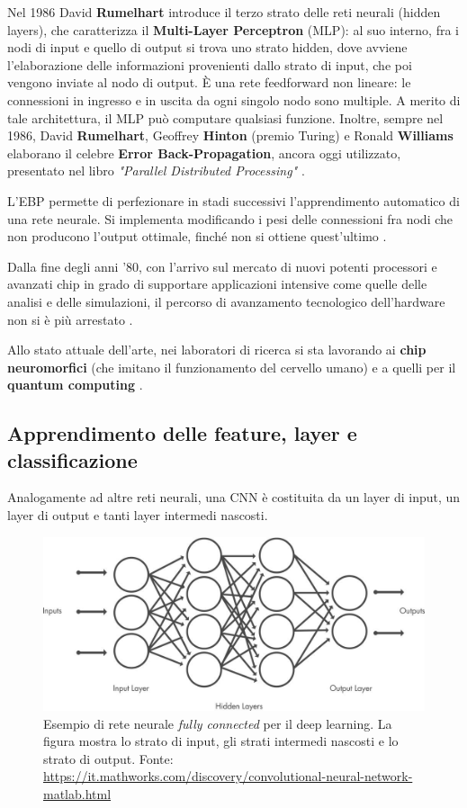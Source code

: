 Nel 1986 David \textbf{Rumelhart} introduce il terzo strato delle reti neurali (hidden layers), che caratterizza il \textbf{Multi-Layer Perceptron} (MLP): al suo interno, fra i nodi di input e quello di output si trova uno strato hidden, dove avviene l’elaborazione delle informazioni provenienti dallo strato di input, che poi vengono inviate al nodo di output. È una rete feedforward non lineare: le connessioni in ingresso e in uscita da ogni singolo nodo sono multiple. A merito di tale architettura, il MLP può computare qualsiasi funzione. Inoltre, sempre nel 1986, David \textbf{Rumelhart}, Geoffrey \textbf{Hinton} (premio Turing) e Ronald \textbf{Williams} elaborano il celebre \textbf{Error Back-Propagation}, ancora oggi utilizzato, presentato nel libro \textit{"Parallel Distributed Processing"} \cite{ai4b_reti_neurali, ia_reti_neurali, camastra_machine_2015}.

L’EBP permette di perfezionare in stadi successivi l’apprendimento automatico di una rete neurale. Si implementa modificando i pesi delle connessioni fra nodi che non producono l’output ottimale, finché non si ottiene quest’ultimo \cite{ia_reti_neurali}.

Dalla fine degli anni ’80, con l’arrivo sul mercato di nuovi potenti processori e avanzati chip in grado di supportare applicazioni intensive come quelle delle analisi e delle simulazioni, il percorso di avanzamento tecnologico dell’hardware non si è più arrestato \cite{ai4b_reti_neurali}. 

Allo stato attuale dell'arte, nei laboratori di ricerca si sta lavorando ai \textbf{chip neuromorfici} (che imitano il funzionamento del cervello umano) e a quelli per il \textbf{quantum computing} \cite{ai4b_reti_neurali}{}.

\subsection{Apprendimento delle feature, layer e classificazione} \label{cnn}
Analogamente ad altre reti neurali, una CNN è costituita da un layer di input, un layer di output e tanti layer intermedi nascosti.

\begin{figure}[H]
    \centering
    \includegraphics[scale=0.34]{images/chapter2/cnn_layers.jpg}
    \caption[Esempio di rete neurale per il deep learning.]{Esempio di rete neurale \textit{fully connected} per il deep learning. La figura mostra lo strato di input, gli strati intermedi nascosti e lo strato di output. Fonte: \url{https://it.mathworks.com/discovery/convolutional-neural-network-matlab.html}}
    \label{fig:cnn_layers}
\end{figure}

